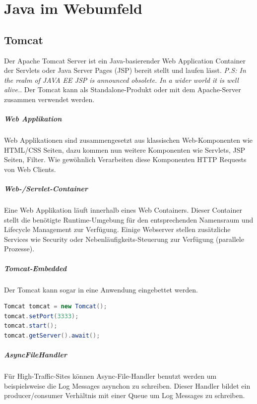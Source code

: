 \chapter{Java im Webumfeld}

\section{Tomcat}
Der Apache Tomcat Server ist ein Java-basierender Web Application Container der Servlets oder Java Server Pages (JSP) bereit stellt und laufen lässt. \emph{P.S: In the realm of JAVA EE JSP is announced \textit{obsolete}. In a wider world it is well alive.}. Der Tomcat kann als Standalone-Produkt oder mit dem Apache-Server zusammen verwendet werden.

\paragraph{Web Applikation}
Web Applikationen sind zusammengesetzt aus klassischen Web-Komponenten wie HTML/CSS Seiten, dazu kommen nun weitere Komponenten wie Servlets, JSP Seiten, Filter. Wie gewöhnlich Verarbeiten diese Komponenten HTTP Requests von Web Clients.

\paragraph{Web-/Servlet-Container}
Eine Web Applikation läuft innerhalb eines Web Containers. Dieser Container stellt die benötigte Runtime-Umgebung für den entsprechenden Namensraum und Lifecycle Management zur Verfügung. Einige Webserver stellen zusätzliche Services wie Security oder Nebenläufigkeits-Steuerung zur Verfügung (parallele Prozesse).

\paragraph{Tomcat-Embedded}
Der Tomcat kann sogar in eine Anwendung eingebettet werden.

\begin{lstlisting}[language=Java]
Tomcat tomcat = new Tomcat();
tomcat.setPort(3333);
tomcat.start();
tomcat.getServer().await();
\end{lstlisting}

\paragraph{AsyncFileHandler}
Für High-Traffic-Sites können Async-File-Handler benutzt werden um beispielsweise die Log Messages asynchon zu schreiben. Dieser Handler bildet ein producer/consumer Verhältnis mit einer Queue um Log Messages zu schreiben.

